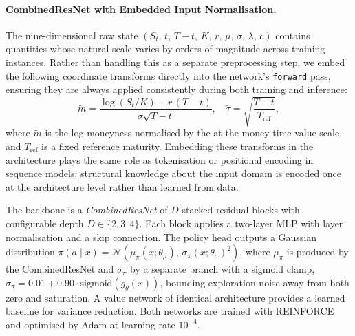 \paragraph{CombinedResNet with Embedded Input Normalisation.}
The nine-dimensional raw state
$(S_t,\, t,\, T\!-\!t,\, K,\, r,\, \mu,\, \sigma,\, \lambda,\, c)$
contains quantities whose natural scale varies by orders of magnitude across
training instances.
Rather than handling this as a separate preprocessing step, we embed the
following coordinate transforms directly into the network's \texttt{forward}
pass, ensuring they are always applied consistently during both training
and inference:
\begin{equation}
  \tilde{m} = \frac{\log(S_t/K) + r\,(T\!-\!t)}{\sigma\sqrt{T\!-\!t}},
  \quad
  \tilde{\tau} = \sqrt{\frac{T\!-\!t}{T_{\mathrm{ref}}}},
  \label{eq:input-transform}
\end{equation}
where $\tilde{m}$ is the log-moneyness normalised by the at-the-money
time-value scale, and $T_{\mathrm{ref}}$ is a fixed reference maturity.
Embedding these transforms in the architecture plays the same role as
tokenisation or positional encoding in sequence models: structural knowledge
about the input domain is encoded once at the architecture level rather than
learned from data.

The backbone is a \emph{CombinedResNet} of $D$ stacked residual blocks
\cite{he2016deep} with configurable depth $D\in\{2,3,4\}$.
Each block applies a two-layer MLP with layer normalisation and a skip
connection.
The policy head outputs a Gaussian distribution
$\pi(a\mid x) = \mathcal{N}\!\left(\mu_\pi(x;\theta_\mu),\,
\sigma_\pi(x;\theta_\sigma)^2\right)$,
where $\mu_\pi$ is produced by the CombinedResNet and $\sigma_\pi$ by a
separate branch with a sigmoid clamp,
$\sigma_\pi = 0.01 + 0.90\cdot\mathrm{sigmoid}(g_\theta(x))$,
bounding exploration noise away from both zero and saturation.
A value network of identical architecture provides a learned baseline for
variance reduction.
Both networks are trained with REINFORCE \cite{williams1992simple} and
optimised by Adam at learning rate $10^{-4}$.

